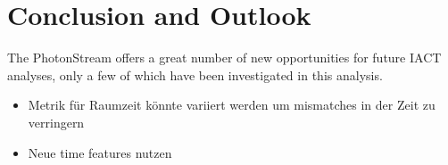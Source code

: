 \chapter{Conclusion and Outlook}
%
The PhotonStream offers a great number of new opportunities for future IACT
analyses, only a few of which have been investigated in this analysis.

\begin{itemize}
  \item Metrik für Raumzeit könnte variiert werden um mismatches in der Zeit zu verringern
  \item Neue time features nutzen
\end{itemize}

